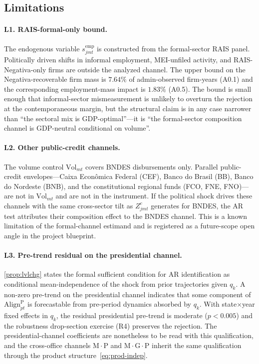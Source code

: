 \documentclass{article}
\newcommand{\Align}{\mathrm{Align}}
\newcommand{\Vol}{\mathrm{Vol}}
\theoremstyle{plain}
\theoremstyle{definition}
\theoremstyle{remark}
\begin{document}
\subsection{Limitations}\label{subsec:limitations}

\paragraph{L1. RAIS-formal-only bound.}
The endogenous variable $s^{\mathrm{emp}}_{jmt}$ is constructed from the
formal-sector RAIS panel. Politically driven shifts in informal employment,
MEI-unfiled activity, and RAIS-Negativa-only firms are outside the analyzed
channel. The upper bound on the Negativa-recoverable firm mass is $7.64\%$
of admin-observed firm-years (A0.1) and the corresponding employment-mass
impact is $1.83\%$ (A0.5). The bound is small enough that informal-sector
mismeasurement is unlikely to overturn the rejection at the contemporaneous
margin, but the structural claim is in any case narrower than ``the sectoral
mix is GDP-optimal''---it is ``the formal-sector composition channel is
GDP-neutral conditional on volume''.

\paragraph{L2. Other public-credit channels.}
The volume control $\Vol_{mt}$ covers BNDES disbursements only. Parallel
public-credit envelopes---Caixa Econômica Federal (CEF), Banco do Brasil
(BB), Banco do Nordeste (BNB), and the constitutional regional funds (FCO,
FNE, FNO)---are not in $\Vol_{mt}$ and are not in the instrument. If the
political shock drives these channels with the same cross-sector tilt as
$Z^{c}_{jmt}$ generates for BNDES, the AR test attributes their composition
effect to the BNDES channel. This is a known limitation of the formal-channel
estimand and is registered as a future-scope open angle in the project
blueprint.

\paragraph{L3. Pre-trend residual on the presidential channel.}
\autoref{prop:lvlchg} states the formal sufficient condition for AR
identification as conditional mean-independence of the shock from prior
trajectories given $q_k$. A non-zero pre-trend on the presidential channel
indicates that some component of $\Align^{\mathrm{P}}_{pt}$ is forecastable
from pre-period dynamics absorbed by $q_k$. With state$\times$year fixed
effects in $q_k$, the residual presidential pre-trend is moderate
($p<0.005$) and the robustness drop-section exercise (R4) preserves the
rejection. The presidential-channel coefficients are nonetheless to be
read with this qualification, and the cross-office channels
$\mathrm{M{\cdot}P}$ and $\mathrm{M{\cdot}G{\cdot}P}$ inherit the same
qualification through the product structure~\eqref{eq:prod-indep}.
\end{document}
